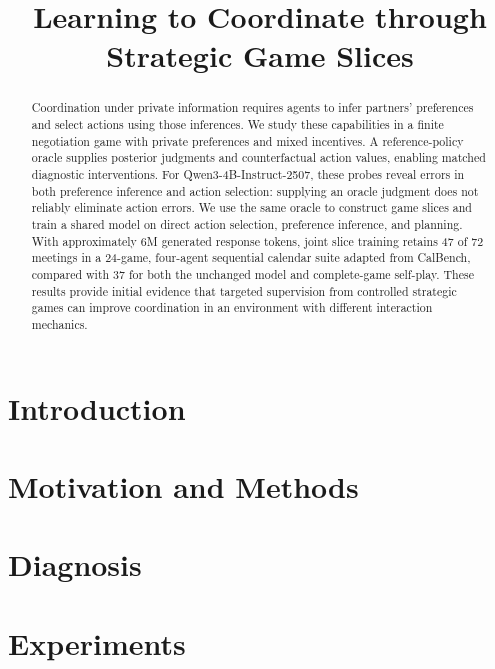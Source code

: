 \documentclass{article} %
\title{Learning to Coordinate through Strategic Game Slices}
\author{}
\begin{document}
\raggedbottom

\maketitle

\begin{abstract}
Coordination under private information requires agents to infer partners’ 
preferences and select actions using those inferences. We study these capabilities 
in a finite negotiation game with private preferences and mixed incentives. 
A reference-policy oracle supplies posterior judgments and counterfactual action values, 
enabling matched diagnostic interventions. For Qwen3-4B-Instruct-2507, these probes 
reveal errors in both preference inference and action selection: supplying an oracle 
judgment does not reliably eliminate action errors. We use the same oracle to construct
game slices and train a shared model on direct action selection, preference inference, 
and planning. With approximately 6M generated response tokens, joint slice training retains 47 of 72 meetings in a 24-game, four-agent sequential calendar suite adapted from CalBench, compared with 37 for both the unchanged model and complete-game self-play. These results provide initial evidence that targeted supervision from controlled strategic games can improve coordination in an environment with different interaction mechanics.
\end{abstract}

\section{Introduction}


\section{Motivation and Methods}


\section{Diagnosis}


\section{Experiments}

\end{document}
